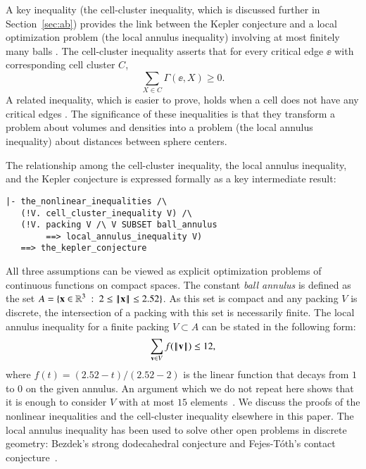 A key inequality (the cell-cluster inequality, which is discussed
further in Section~\ref{sec:ab}) provides the link between the Kepler
conjecture and a local optimization problem (the local annulus
inequality) involving at most finitely many balls \cite[6.93]{DSP}.
The cell-cluster inequality asserts that for every critical edge $\ee$
with corresponding cell cluster $C$,
\[
\sum_{X\in C} \Gamma(\ee,X)\ge 0.
\]
A related inequality, which  is easier to prove, holds when a cell does
not have any critical edges \cite[6.92]{DSP}.  The significance of
these inequalities is that they transform a problem about volumes and
densities into a problem (the local annulus inequality) about
distances between sphere centers.

The relationship among the cell-cluster inequality, the local annulus
inequality, and the Kepler conjecture is expressed formally as a
key intermediate result:
% 

\begin{Verbatim}[fontsize=\small]
|- the_nonlinear_inequalities /\ 
   (!V. cell_cluster_inequality V) /\
   (!V. packing V /\ V SUBSET ball_annulus 
        ==> local_annulus_inequality V) 
   ==> the_kepler_conjecture
\end{Verbatim}

All three assumptions can be viewed as explicit optimization problems
of continuous functions on compact spaces.
The constant {\it ball annulus} is defined as the set
$A=\{{\bf x}\in\mathbb{R}^3 \ :\  2\le {\hbox{\ensuremath{\hspace{0.1em}|\hspace{-0.1em}|\hspace{0.1em}}}{\bf x}\hbox{\ensuremath{\hspace{0.1em}|\hspace{-0.1em}|\hspace{0.1em}}}} \le 2.52\}$.  As this set is
compact and any packing $V$ is discrete, the intersection of a packing
with this set is necessarily finite.   The local annulus inequality for a finite
packing $V\subset A$ can be stated in the following form:
\begin{equation}\label{eqn:la}
\sum_{{\mathbf v}\in V} f({\hbox{\ensuremath{\hspace{0.1em}|\hspace{-0.1em}|\hspace{0.1em}}}{\mathbf v}\hbox{\ensuremath{\hspace{0.1em}|\hspace{-0.1em}|\hspace{0.1em}}}})  \le 12,
\end{equation}
where $f(t) = (2.52-t)/(2.52-2)$ is the linear function that decays
from $1$ to $0$ on the given annulus.  An argument which we do not
repeat here shows that it is enough to consider $V$ with at most $15$
elements~\cite[Lemma~6.110]{DSP}.  We discuss the proofs of the nonlinear
inequalities and the cell-cluster inequality elsewhere in this paper.
The local annulus inequality has been used to solve other open
problems in discrete geometry: Bezdek's strong dodecahedral conjecture
and Fejes-T\'oth's contact conjecture~\cite{hales2011strong}.

